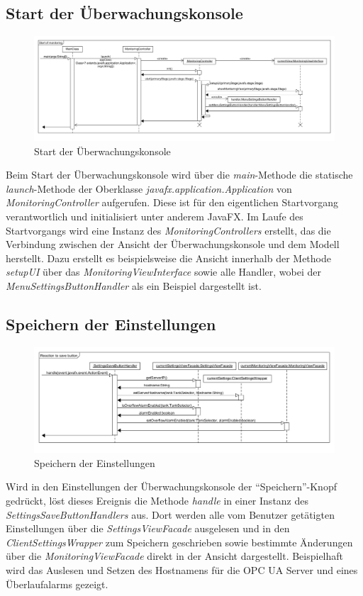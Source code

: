 \documentclass[parskip=full]{scrartcl}
\begin{document}
\subsection{Start der Überwachungskonsole}
\begin{figure}[H]
	\centering
	\includegraphics[scale=0.3]{design/sequence-diagrams/Start-of-monitoring.png}
	\caption{Start der Überwachungskonsole}
\end{figure}
Beim Start der Überwachungskonsole wird über die \emph{main}-Methode die statische \emph{launch}-Methode der Oberklasse \emph{javafx.application.Application} von \emph{MonitoringController} aufgerufen. Diese ist für den eigentlichen Startvorgang verantwortlich und initialisiert unter anderem JavaFX.
Im Laufe des Startvorgangs wird eine Instanz des \emph{MonitoringControllers} erstellt, das die Verbindung zwischen der Ansicht der Überwachungskonsole und dem Modell herstellt. Dazu erstellt es beispielsweise die Ansicht innerhalb der Methode \emph{setupUI} über das \emph{MonitoringViewInterface} sowie alle Handler, wobei der \emph{MenuSettingsButtonHandler} als ein Beispiel dargestellt ist.

\subsection{Speichern der Einstellungen}
\begin{figure}[H]
	\centering
	\includegraphics[scale=0.4]{design/sequence-diagrams/Save-settings.png}
	\caption{Speichern der Einstellungen}
\end{figure}
Wird in den Einstellungen der Überwachungskonsole der "`Speichern"'-Knopf gedrückt, löst dieses Ereignis die Methode \emph{handle} in einer Instanz des \emph{SettingsSaveButtonHandlers} aus.
Dort werden alle vom Benutzer getätigten Einstellungen über die \emph{SettingsViewFacade} ausgelesen und in den \emph{ClientSettingsWrapper} zum Speichern geschrieben sowie bestimmte Änderungen über die \emph{MonitoringViewFacade} direkt in der Ansicht dargestellt.
Beispielhaft wird das Auslesen und Setzen des Hostnamens für die OPC UA Server und eines Überlaufalarms gezeigt.
\end{document}
